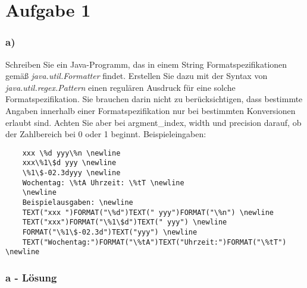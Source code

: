 \chapter{Aufgabe 1}
\label{sec:aufgabe1}

\subsection*{a)}
Schreiben Sie ein Java-Programm, das in einem String Formatspezifikationen gemäß
\textit{java.util.Formatter}
findet. \newline
Erstellen Sie dazu mit der Syntax von
\textit{java.util.regex.Pattern}
einen regulären Ausdruck für eine solche Formatspezifikation. \newline
Sie brauchen darin nicht zu berücksichtigen, dass bestimmte Angaben innerhalb einer Formatspezifikation
nur bei bestimmten Konversionen erlaubt sind.
Achten Sie aber bei argment\_index, width und precision darauf, ob der Zahlbereich bei 0 oder 1 beginnt. \newline
\newline
Beispieleingaben: \newline
\begin{verbatim}
	xxx \%d yyy\%n \newline
	xxx\%1\$d yyy \newline
	\%1\$-02.3dyyy \newline
	Wochentag: \%tA Uhrzeit: \%tT \newline
	\newline
	Beispielausgaben: \newline
	TEXT("xxx ")FORMAT("\%d")TEXT(" yyy")FORMAT("\%n") \newline
	TEXT("xxx")FORMAT("\%1\$d")TEXT(" yyy") \newline
	FORMAT("\%1\$-02.3d")TEXT("yyy") \newline
	TEXT("Wochentag:")FORMAT("\%tA")TEXT("Uhrzeit:")FORMAT("\%tT") \newline
\end{verbatim}

\newline

\newpage
\subsection*{a - Lösung}

